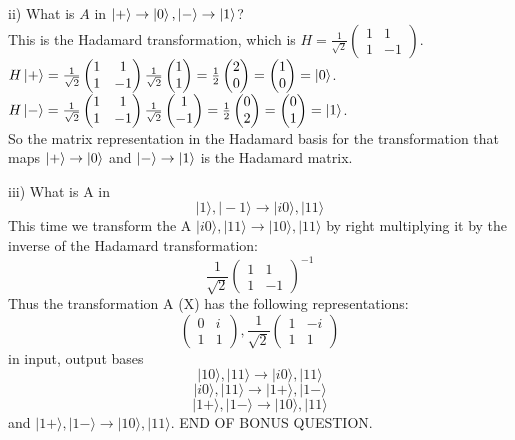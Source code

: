 \documentclass{article}
\newcommand{\0}{{$|0\rangle$}}
\newcommand{\1}{{$|1\rangle$}}
\begin{document}
ii) What is $A$ in $\ket{+} \to \ket{0}, \ket{-} \to \ket{1}$? \\
This is the Hadamard transformation, which is $H = \frac{1}{\sqrt{2}} \begin{pmatrix} 1 & 1 \\ 1 & -1 \end{pmatrix}$. \\
$H\ket{+} = \frac{1}{\sqrt{2}} \begin{pmatrix} 1 & 1 \\ 1 & -1 \end{pmatrix} \frac{1}{\sqrt{2}} \begin{pmatrix} 1 \\ 1 \end{pmatrix} = \frac{1}{2} \begin{pmatrix} 2 \\ 0 \end{pmatrix} = \begin{pmatrix} 1 \\ 0 \end{pmatrix} = \ket{0}$. \\
$H\ket{-} = \frac{1}{\sqrt{2}} \begin{pmatrix} 1 & 1 \\ 1 & -1 \end{pmatrix} \frac{1}{\sqrt{2}} \begin{pmatrix} 1 \\ -1 \end{pmatrix} = \frac{1}{2} \begin{pmatrix} 0 \\ 2 \end{pmatrix} = \begin{pmatrix} 0 \\ 1 \end{pmatrix} = \ket{1}$. \\
So the matrix representation in the Hadamard basis for the transformation that maps $\ket{+} \to \ket{0}$ and $\ket{-} \to \ket{1}$ is the Hadamard matrix.



iii) What is A in
$$
|1\rangle, |-1\rangle \to |i0\rangle, |11\rangle
$$
This time we transform
the A $|i0\rangle, |11\rangle \to |10\rangle, |11\rangle$
by right multiplying it
by the inverse of the
Hadamard transformation:
$$
\frac{1}{\sqrt{2}}\begin{pmatrix} 1 & 1 \\ 1 & -1 \end{pmatrix}^{-1}
$$
Thus the transformation
A (X) has the following
representations:
$$
\begin{pmatrix} 0 & i \\ 1 & 1 \end{pmatrix}, \frac{1}{\sqrt{2}}\begin{pmatrix} 1 & -i \\ 1 & 1 \end{pmatrix}
$$
in input, output bases
$$
|10\rangle, |11\rangle \to |i0\rangle, |11\rangle
$$
$$
|i0\rangle, |11\rangle \to |1+\rangle, |1-\rangle
$$
$$
|1+\rangle, |1-\rangle \to |10\rangle, |11\rangle
$$
and $|1+\rangle, |1-\rangle \to |10\rangle, |11\rangle$.
END OF BONUS QUESTION.
\end{document}
